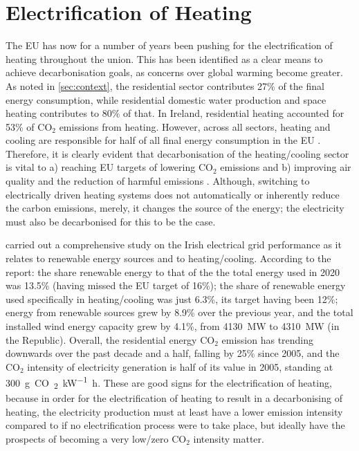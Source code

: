 \section{Electrification of Heating}
The EU has now for a number of years been pushing for the electrification of heating throughout the union. This has been identified as a clear means to achieve decarbonisation goals, as concerns over global warming become greater. As noted in \cref{sec:context}, the residential sector contributes 27\% of the final energy consumption, while residential domestic water production and space heating contributes to 80\% of that. In Ireland, residential heating accounted for 53\% of $\text{CO}_2$ emissions from heating. However, across all sectors, heating and cooling are responsible for half of all final energy consumption in the EU \cite{an2016strategy}. Therefore, it is clearly evident that decarbonisation of the heating/cooling sector is vital to a) reaching EU targets of lowering $\text{CO}_2$ emissions and b) improving air quality and the reduction of harmful emissions \cite{epri2018us}. Although, switching to electrically driven heating systems does not automatically or inherently reduce the carbon emissions, merely, it changes the source of the energy; the electricity must also be decarbonised for this to be the case. 

\citeauthor{seai_energy_2021} \cite{seai_energy_2021} carried out a comprehensive study on the Irish electrical grid performance as it relates to renewable energy sources and to heating/cooling. According to the report: the share renewable energy to that of the the total energy used in 2020 was 13.5\% (having missed the EU target of 16\%); the share of renewable energy used specifically in heating/cooling was just 6.3\%, its target having been 12\%; energy from renewable sources grew by 8.9\% over the previous year, and the total installed wind energy capacity grew by 4.1\%, from \SI{4130}{\mega\watt} to \SI{4310}{\mega\watt} (in the Republic). Overall, the residential energy $\text{CO}_2$ emission has trending downwards over the past decade and a half, falling by 25\% since 2005, and the $\text{CO}_2$ intensity of electricity generation is half of its value in 2005, standing at \SI{300}{\gram CO\textsubscript{2}\per\kilo\watt\hour}. These are good signs for the electrification of heating, because in order for the electrification of heating to result in a decarbonising of heating, the electricity production must at least have a lower emission intensity compared to if no electrification process were to take place, but ideally have the prospects of becoming a very low/zero $\text{CO}_2$ intensity matter.

